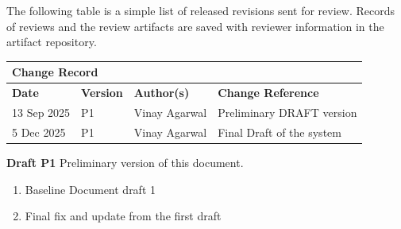 The following table is a simple list of released revisions sent for review.
Records of reviews and the review artifacts are saved with reviewer information in the \KNEADagencyName artifact repository.

\begin{table}[h]
	\centering 
		\begin{tabular}{|p{1.0in}|p{0.8in}|p{1.4in}|p{2.1in}|}
    \multicolumn{4}{l}{\bfseries Change Record} \\
		\hline
			{\bfseries Date}  &  {\bfseries Version} & {\bfseries Author(s)} & {\bfseries Change Reference} \\
		\hline
		\hline
			 13 Sep 2025	&	\centering	P1	&	{\raggedright Vinay Agarwal}	&	Preliminary DRAFT version  \\ \hline
			 5  Dec 2025    &   \centering  P1  &   {\raggedright Vinay Agarwal}    &   Final Draft of the system  \\ \hline
		\hline		
		\hline				
  	\end{tabular}
\end{table}




{\bf Draft P1}
Preliminary version of this document.

\begin{enumerate}[itemindent=5pt,topsep=0pt,itemsep=0pt,partopsep=0pt, parsep=0pt]
	\item Baseline Document draft 1     
	\item Final fix and update from the first draft      
\end{enumerate}

